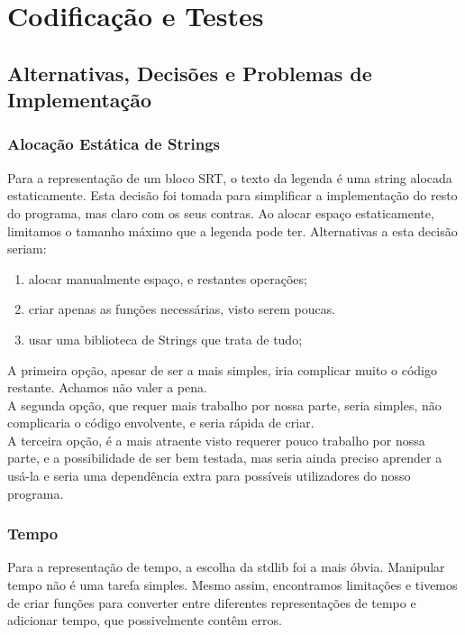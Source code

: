 \documentclass{report}
\begin{document}
\chapter{Codificação e Testes}

\section{Alternativas, Decisões e Problemas de Implementação}

\subsection{Alocação Estática de Strings}

Para a representação de um bloco SRT, o texto da legenda é uma string alocada estaticamente. Esta decisão foi tomada para simplificar a implementação do resto do programa, mas claro com os seus contras. Ao alocar espaço estaticamente, limitamos o tamanho máximo que a legenda pode ter.
Alternativas a esta decisão seriam:

\begin{enumerate}
    \item alocar manualmente espaço, e restantes operações;
    \item criar apenas as funções necessárias, visto serem poucas.
    \item usar uma biblioteca de Strings que trata de tudo;
\end{enumerate}

A primeira opção, apesar de ser a mais simples, iria complicar muito o código restante. Achamos não valer a pena.\\
A segunda opção, que requer mais trabalho por nossa parte, seria simples, não complicaria o código envolvente, e seria rápida de criar.\\
A terceira opção, é a mais atraente visto requerer pouco trabalho por nossa parte, e a possibilidade de ser bem testada, mas seria ainda preciso aprender a usá-la e seria uma dependência extra para possíveis utilizadores do nosso programa.

\subsection{Tempo}

Para a representação de tempo, a escolha da stdlib foi a mais óbvia. Manipular tempo não é uma tarefa simples. Mesmo assim, encontramos limitações e tivemos de criar funções para converter entre diferentes representações de tempo e adicionar tempo, que possivelmente contêm erros.\\
\end{document}
